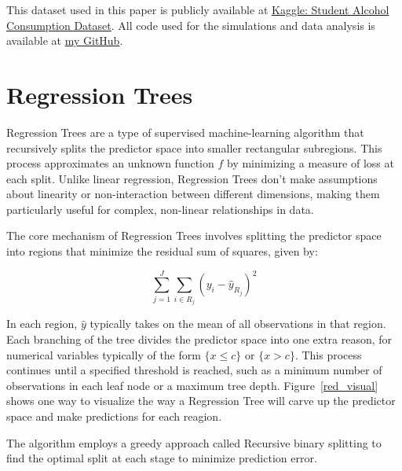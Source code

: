 \documentclass[12pt]{article}
\begin{document}
This dataset used in this paper is publicly available at \href{https://www.kaggle.com/datasets/uciml/student-alcohol-consumption}{Kaggle: Student Alcohol Consumption Dataset}. All code used for the simulations and data analysis is available at \href{https://github.com/Tim2othy/wissenschaftliches-arbeiten}{my GitHub}.


\section{Regression Trees}

Regression Trees are a type of supervised machine-learning algorithm that recursively splits the predictor space into smaller rectangular subregions. This process approximates an unknown function $f$ by minimizing a measure of loss at each split. Unlike linear regression, Regression Trees don't make assumptions about linearity or non-interaction between different dimensions, making them particularly useful for complex, non-linear relationships in data.

The core mechanism of Regression Trees involves splitting the predictor space into regions that minimize the residual sum of squares, given by:

\begin{equation}
    \sum_{j=1}^{J} \sum_{i \in R_j} ( y_i- \hat{y}_{R_j})^2
\end{equation}

In each region, $\hat{y}$ typically takes on the mean of all observations in that region. Each branching of the tree divides the predictor space into one extra reason, for numerical variables typically of the form $\{x \le c\}$ or $\{x > c\}$. This process continues until a specified threshold is reached, such as a minimum number of observations in each leaf node or a maximum tree depth. Figure~\ref{red_visual} shows one way to visualize the way a Regression Tree will carve up the predictor space and make predictions for each reagion.

The algorithm employs a greedy approach called Recursive binary splitting to find the optimal split at each stage to minimize prediction error.
\end{document}
